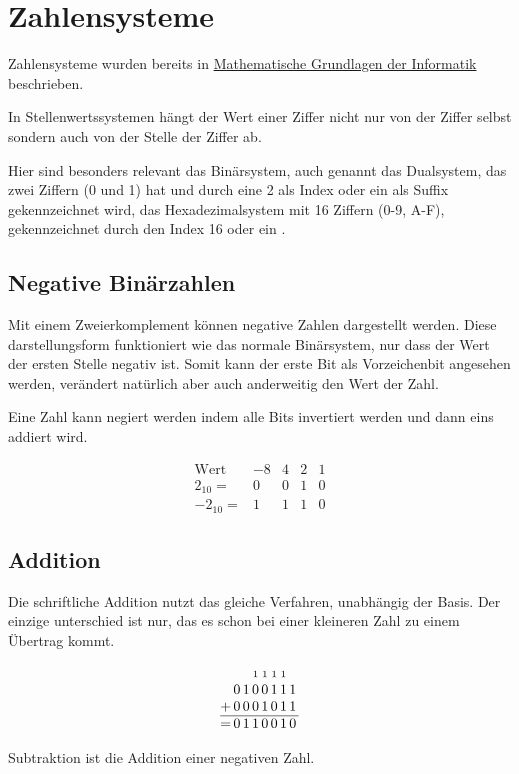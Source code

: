 \documentclass{article}
\begin{document}
\section{Zahlensysteme} 
Zahlensysteme wurden bereits in \hyperref[sec:mathe_zahlensysteme]{Mathematische Grundlagen der Informatik} beschrieben.

In Stellenwertssystemen hängt der Wert einer Ziffer nicht nur von der Ziffer selbst sondern auch von der Stelle der Ziffer ab.

Hier sind besonders relevant das Binärsystem, auch genannt das Dualsystem, das zwei Ziffern (0 und 1) hat und durch eine 2 als Index oder ein \bb als Suffix gekennzeichnet wird, das Hexadezimalsystem mit 16 Ziffern (0-9, A-F), gekennzeichnet durch den Index 16 oder ein \bh. 

\subsection{Negative Binärzahlen}
Mit einem Zweierkomplement können negative Zahlen dargestellt werden. Diese darstellungsform funktioniert wie das normale Binärsystem, nur dass der Wert der ersten Stelle negativ ist. Somit kann der erste Bit als Vorzeichenbit angesehen werden, verändert natürlich aber auch anderweitig den Wert der Zahl.

Eine Zahl kann negiert werden indem alle Bits invertiert werden und dann eins addiert wird.
\begin{zexample}%
\[
\begin{array}{r|rrrr}
  \text{Wert} & -8 & 4 & 2 & 1 \\
  \hline
  2_{10}  = & 0 & 0 & 1 & 0 \\
  -2_{10} = & 1 & 1 & 1 & 0
\end{array}
\]
\end{zexample}

\subsection{Addition}
Die schriftliche Addition nutzt das gleiche Verfahren, unabhängig der Basis. Der einzige unterschied ist nur, das es schon bei einer kleineren Zahl zu einem Übertrag kommt.
\begin{zexample}%
\[
\begin{array}{@{}c@{\,}c@{\,}c@{\,}c@{\,}c@{\,}c@{\,}c@{\,}c@{\,}c@{}}
    & & & \scriptstyle 1  & \scriptstyle 1 & \scriptstyle 1 & \scriptstyle 1 & \\
    & 0 & 1 & 0 & 0 & 1 & 1 & 1 \\
  + & 0 & 0 & 0 & 1 & 0 & 1 & 1 \\
  \hline
  = & 0 & 1 & 1 & 0 & 0 & 1 & 0
\end{array}
\]
\end{zexample}
Subtraktion ist die Addition einer negativen Zahl. 
\end{document}
